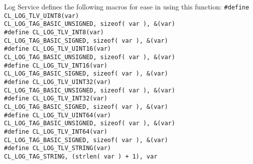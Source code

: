 \begin{flushleft}
\begin{Desc}
\begin{description}
Log Service defines the following macros for ease in using this function:
{\tt{\#define CL\_\-LOG\_\-TLV\_\-UINT8(var)}}				\\
{\tt{CL\_\-LOG\_\-TAG\_\-BASIC\_\-UNSIGNED, sizeof( var ), \&(var)}}\\
{\tt{\#define CL\_\-LOG\_\-TLV\_\-INT8(var)}}				\\
{\tt{CL\_\-LOG\_\-TAG\_\-BASIC\_\-SIGNED, sizeof( var ), \&(var)}}\\
{\tt{\#define CL\_\-LOG\_\-TLV\_\-UINT16(var)}}				\\
{\tt{CL\_\-LOG\_\-TAG\_\-BASIC\_\-UNSIGNED, sizeof( var ), \&(var)}}\\
{\tt{\#define CL\_\-LOG\_\-TLV\_\-INT16(var)}}				\\
{\tt{CL\_\-LOG\_\-TAG\_\-BASIC\_\-SIGNED, sizeof( var ), \&(var)}}\\
{\tt{\#define CL\_\-LOG\_\-TLV\_\-UINT32(var)}}	\\
{\tt{CL\_\-LOG\_\-TAG\_\-BASIC\_\-UNSIGNED, sizeof( var ), \&(var)}}\\
{\tt{\#define CL\_\-LOG\_\-TLV\_\-INT32(var)}}		\\
{\tt{CL\_\-LOG\_\-TAG\_\-BASIC\_\-SIGNED, sizeof( var ), \&(var)}}\\
{\tt{\#define CL\_\-LOG\_\-TLV\_\-UINT64(var)}}				\\
{\tt{CL\_\-LOG\_\-TAG\_\-BASIC\_\-UNSIGNED, sizeof( var ), \&(var)}}\\
{\tt{\#define CL\_\-LOG\_\-TLV\_\-INT64(var)}}				\\
{\tt{CL\_\-LOG\_\-TAG\_\-BASIC\_\-SIGNED, sizeof( var ), \&(var)}}\\
{\tt{\#define CL\_\-LOG\_\-TLV\_\-STRING(var)}}				\\
{\tt{CL\_\-LOG\_\-TAG\_\-STRING, (strlen( var ) + 1), var}}


\end{description}
\end{Desc}
\end{flushleft}
